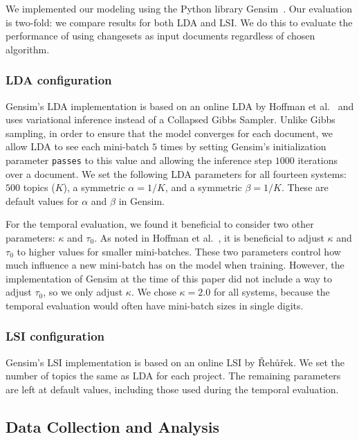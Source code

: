 We implemented our modeling using the Python library Gensim~\cite{Gensim}.
Our evaluation is two-fold: we compare results for both LDA and LSI.
We do this to evaluate the performance of using changesets as input
documents regardless of chosen algorithm.

\subsubsection{LDA configuration}

Gensim's LDA implementation is based on an online LDA by Hoffman et al.~\cite{Hoffman-etal:2010}
and uses variational inference instead of a Collapsed Gibbs Sampler.
Unlike Gibbs sampling, in order to ensure that the model converges for each document,
we allow LDA to see each mini-batch $5$ times by setting Gensim's initialization parameter \texttt{passes} to this value
and allowing the inference step $1000$ iterations over a document.
We set the following LDA parameters for all fourteen systems:
$500$ topics ($K$), a symmetric $\alpha=1/K$, and a symmetric $\beta=1/K$.
These are default values for $\alpha$ and $\beta$ in Gensim.

For the temporal evaluation, we found it beneficial to consider two other parameters: $\kappa$ and $\tau_0$.
As noted in Hoffman et al.~\cite{Hoffman-etal:2010}, it is beneficial to
adjust $\kappa$ and $\tau_0$ to higher values for smaller mini-batches.
These two parameters control how much influence a new mini-batch has on the model when training.
However, the implementation of Gensim at the time of this paper did not
include a way to adjust $\tau_0$, so we only adjust $\kappa$.
We chose $\kappa=2.0$ for all systems, because the temporal evaluation
would often have mini-batch sizes in single digits.

\subsubsection{LSI configuration}

Gensim's LSI implementation is based on an online LSI by {\v R}eh{\r u}{\v r}ek\cite{Radim:2011}.
We set the number of topics the same as LDA for each project.
The remaining parameters are left at default values, including those used
during the temporal evaluation.




\subsection{Data Collection and Analysis}
\label{sec:data}

